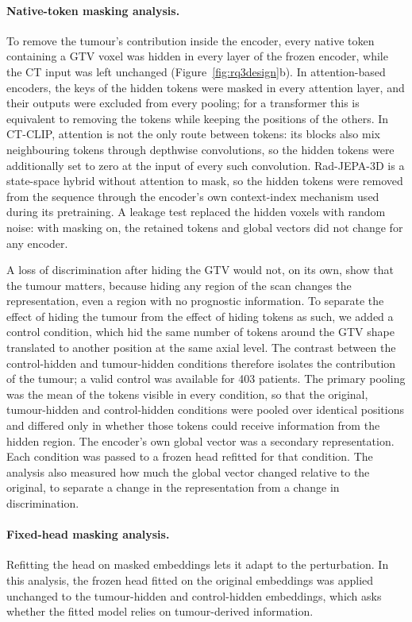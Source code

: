 \paragraph{Native-token masking analysis.} To remove the tumour's contribution inside the encoder, every native token containing a GTV voxel was hidden in every layer of the frozen encoder, while the CT input was left unchanged (Figure~\ref{fig:rq3design}b). In attention-based encoders, the keys of the hidden tokens were masked in every attention layer, and their outputs were excluded from every pooling; for a transformer this is equivalent to removing the tokens while keeping the positions of the others. In CT-CLIP, attention is not the only route between tokens: its blocks also mix neighbouring tokens through depthwise convolutions, so the hidden tokens were additionally set to zero at the input of every such convolution. Rad-JEPA-3D is a state-space hybrid without attention to mask, so the hidden tokens were removed from the sequence through the encoder's own context-index mechanism used during its pretraining. A leakage test replaced the hidden voxels with random noise: with masking on, the retained tokens and global vectors did not change for any encoder.

A loss of discrimination after hiding the GTV would not, on its own, show that the tumour matters, because hiding any region of the scan changes the representation, even a region with no prognostic information. To separate the effect of hiding the tumour from the effect of hiding tokens as such, we added a control condition, which hid the same number of tokens around the GTV shape translated to another position at the same axial level. The contrast between the control-hidden and tumour-hidden conditions therefore isolates the contribution of the tumour; a valid control was available for 403 patients. The primary pooling was the mean of the tokens visible in every condition, so that the original, tumour-hidden and control-hidden conditions were pooled over identical positions and differed only in whether those tokens could receive information from the hidden region. The encoder's own global vector was a secondary representation. Each condition was passed to a frozen head refitted for that condition. The analysis also measured how much the global vector changed relative to the original, to separate a change in the representation from a change in discrimination.

\paragraph{Fixed-head masking analysis.} Refitting the head on masked embeddings lets it adapt to the perturbation. In this analysis, the frozen head fitted on the original embeddings was applied unchanged to the tumour-hidden and control-hidden embeddings, which asks whether the fitted model relies on tumour-derived information.


